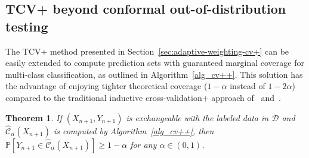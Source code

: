 \documentclass[11pt]{article}
\newtheorem{theorem}{Theorem}
\renewcommand{\P}[1]{\mathbb{P}\left[#1\right]}
\begin{document}



\subsection{TCV+ beyond conformal out-of-distribution testing} \label{sec:cv++_general}

The TCV+ method presented in Section~\ref{sec:adaptive-weighting-cv+} can be easily extended to compute prediction sets with guaranteed marginal coverage for multi-class classification, as outlined in Algorithm~\ref{alg_cv++}. This solution has the advantage of enjoying tighter theoretical coverage ($1-\alpha$ instead of $1-2\alpha$) compared to the traditional inductive cross-validation+ approach of~\cite{barber2019predictive} and~\cite{romano2020classification}.

\begin{theorem} \label{theorem:general_tcv+}
  If $(X_{n+1},Y_{n+1})$ is exchangeable with the labeled data in $\mathcal{D}$ and $\hat{\mathcal{C}}_{\alpha}(X_{n+1})$ is computed by Algorithm~\ref{alg_cv++}, then $\P{Y_{n+1} \in \hat{\mathcal{C}}_{\alpha}(X_{n+1}) } \geq 1-\alpha$ for any $\alpha \in (0,1)$.
\end{theorem}
\end{document}
